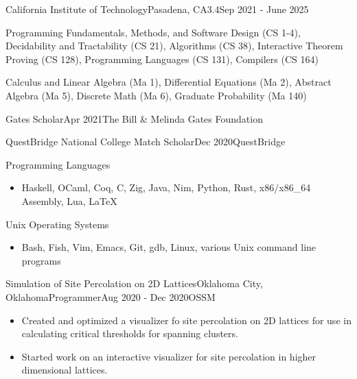 \documentclass[a4paper]{article}
\begin{document}

    \begin{school}{California Institute of Technology}{Pasadena, CA}{3.4}{Sep 2021 - June 2025}
        \item Programming Fundamentals, Methods, and Software Design (CS 1-4), Decidability and Tractability (CS 21), Algorithms (CS 38), Interactive Theorem Proving (CS 128), Programming Languages (CS 131), Compilers (CS 164)
        \item Calculus and Linear Algebra (Ma 1), Differential Equations (Ma 2), Abstract Algebra (Ma 5), Discrete Math (Ma 6), Graduate Probability (Ma 140)
    \end{school}
    \begin{award*}{Gates Scholar}{Apr 2021}{The Bill \& Melinda Gates Foundation}
    \end{award*}
    \begin{award*}{QuestBridge National College Match Scholar}{Dec 2020}{QuestBridge}
    \end{award*}

    \begin{skill}{Programming Languages}
      \begin{itemize}[nosep]
        \item Haskell, OCaml, Coq, C, Zig, Java, Nim, Python, Rust, x86/x86\_64 Assembly, Lua, \LaTeX
      \end{itemize}
    \end{skill}
    \begin{skill}{Unix Operating Systems}
      \begin{itemize}[nosep]
        \item Bash, Fish, Vim, Emacs, Git, gdb, Linux, various Unix command line programs
     \end{itemize}
    \end{skill}

    \begin{activity}{Simulation of Site Percolation on 2D Lattices}{Oklahoma City, Oklahoma}{Programmer}{Aug 2020 - Dec 2020}{OSSM}
      \begin{itemize}[topsep=5pt, partopsep=0pt, itemsep=-1pt]
        \item Created and optimized a visualizer fo site percolation on 2D lattices for use in calculating critical thresholds for spanning clusters.
        \item Started work on an interactive visualizer for site percolation in higher dimensional lattices.
      \end{itemize}
    \end{activity}
\end{document}
